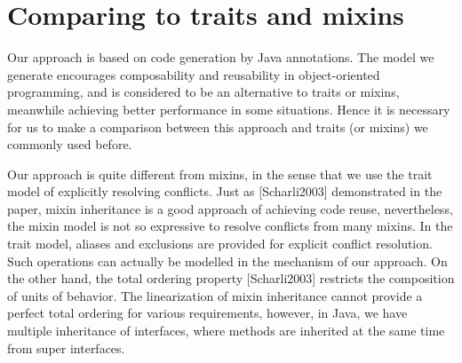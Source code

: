 \section{Comparing to traits and mixins}\label{sec:comparison}

\begin{comment}
Haoyuan

   - vs both: we do automatic return type refinement, which has useful applications
   (example: Expression Problem)

   - vs traits: we support of methods to create new objects (a replacement to constructors);
   Moreover we have the with and clone methods (we miss more applications for those). Show
   how to model the operations on traits; discuss operations that we cannot model
   (example: renaming).

   - vs mixins: we use the trait model of explicitly resolving conflicts. This is arguably
   better for reasoning.
\end{comment}

Our approach is based on code generation by Java annotations. The model we generate encourages composability and reusability in object-oriented programming, and is considered to be an alternative to traits or mixins,  meanwhile achieving better performance in some situations. Hence it is necessary for us to make a comparison between this approach and traits (or mixins) we commonly used before.

Our approach is quite different from mixins, in the sense that we use the trait model of explicitly resolving conflicts. Just as [Scharli2003] demonstrated in the paper, mixin inheritance is a good approach of achieving code reuse, nevertheless, the mixin model is not so expressive to resolve conflicts from many mixins. In the trait model, aliases and exclusions are provided for explicit conflict resolution. Such operations can actually be modelled in the mechanism of our approach. On the other hand, the total ordering property [Scharli2003] restricts the composition of units of behavior. The linearization of mixin inheritance cannot provide a perfect total ordering for various requirements, however, in Java, we have multiple inheritance of interfaces, where methods are inherited at the same time from super interfaces.


